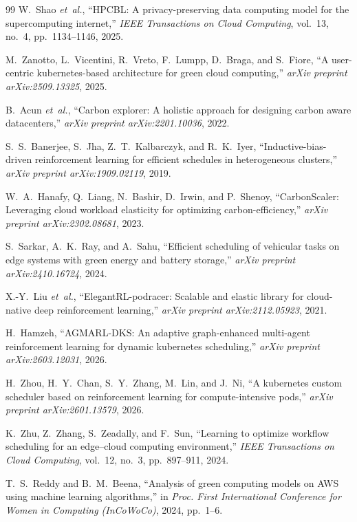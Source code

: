 \documentclass[12pt]{report}
\begin{document}
\begin{singlespace}
\begin{thebibliography}{99}
W.~Shao \emph{et~al.}, ``HPCBL: A privacy-preserving data computing model for the supercomputing internet,'' \emph{IEEE Transactions on Cloud Computing}, vol.~13, no.~4, pp.~1134--1146, 2025.

M.~Zanotto, L.~Vicentini, R.~Vreto, F.~Lumpp, D.~Braga, and S.~Fiore, ``A user-centric kubernetes-based architecture for green cloud computing,'' \emph{arXiv preprint arXiv:2509.13325}, 2025.

B.~Acun \emph{et~al.}, ``Carbon explorer: A holistic approach for designing carbon aware datacenters,'' \emph{arXiv preprint arXiv:2201.10036}, 2022.

S.~S.~Banerjee, S.~Jha, Z.~T.~Kalbarczyk, and R.~K.~Iyer, ``Inductive-bias-driven reinforcement learning for efficient schedules in heterogeneous clusters,'' \emph{arXiv preprint arXiv:1909.02119}, 2019.

W.~A.~Hanafy, Q.~Liang, N.~Bashir, D.~Irwin, and P.~Shenoy, ``CarbonScaler: Leveraging cloud workload elasticity for optimizing carbon-efficiency,'' \emph{arXiv preprint arXiv:2302.08681}, 2023.

S.~Sarkar, A.~K.~Ray, and A.~Sahu, ``Efficient scheduling of vehicular tasks on edge systems with green energy and battery storage,'' \emph{arXiv preprint arXiv:2410.16724}, 2024.

X.-Y.~Liu \emph{et~al.}, ``ElegantRL-podracer: Scalable and elastic library for cloud-native deep reinforcement learning,'' \emph{arXiv preprint arXiv:2112.05923}, 2021.

H.~Hamzeh, ``AGMARL-DKS: An adaptive graph-enhanced multi-agent reinforcement learning for dynamic kubernetes scheduling,'' \emph{arXiv preprint arXiv:2603.12031}, 2026.

H.~Zhou, H.~Y.~Chan, S.~Y.~Zhang, M.~Lin, and J.~Ni, ``A kubernetes custom scheduler based on reinforcement learning for compute-intensive pods,'' \emph{arXiv preprint arXiv:2601.13579}, 2026.

K.~Zhu, Z.~Zhang, S.~Zeadally, and F.~Sun, ``Learning to optimize workflow scheduling for an edge--cloud computing environment,'' \emph{IEEE Transactions on Cloud Computing}, vol.~12, no.~3, pp.~897--911, 2024.

T.~S.~Reddy and B.~M.~Beena, ``Analysis of green computing models on AWS using machine learning algorithms,'' in \emph{Proc. First International Conference for Women in Computing (InCoWoCo)}, 2024, pp.~1--6.


\end{thebibliography}
\end{singlespace}
\end{document}
